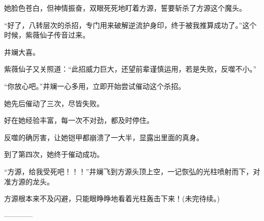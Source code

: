 \begin{this_body}
她脸色苍白，但神情振奋，双眼死死地盯着方源，誓要斩杀了方源这个魔头。

“好了，八转层次的杀招，专门用来破解逆流护身印，终于被我推算成功了。”这个时候，紫薇仙子传音过来。

井斓大喜。

紫薇仙子又关照道：“此招威力巨大，还望前辈谨慎运用，若是失败，反噬不小。”

“你放心吧。”井斓一心多用，立即开始尝试催动这个杀招。

她先后催动了三次，尽皆失败。

好在她经验丰富，每一次不对劲，都及时停住。

反噬的确厉害，让她铠甲都崩溃了一大半，显露出里面的真身。

到了第四次，她终于催动成功。

“方源，给我受死吧！！！”井斓飞到方源头顶上空，一记恢弘的光柱喷射而下，对准方源的龙头。

方源根本来不及闪避，只能眼睁睁地看着光柱轰击下来！(未完待续。)

------------

\end{this_body}

